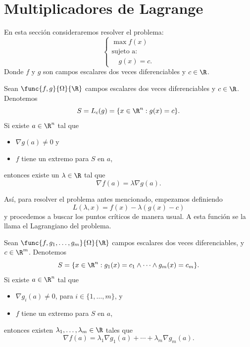 \documentclass[a4,11pt]{aleph-notas}
\begin{document}
\section{Multiplicadores de Lagrange}

En esta sección consideraremos resolver el problema:
\[
    \left\{
    \begin{array}{l}
         \max f(x) \\
         \text{sujeto a:}\\
         \quad g(x)=c.
    \end{array}\right.
\]
Donde $f$ y $g$ son campos escalares dos veces diferenciables y $c\in\R$.

\begin{teo}
    Sean $\func{f,g}{\Omega}{\R}$ campos escalares dos veces diferenciables y $c\in \R$. Denotemos
    \[
        S = L_c(g) = \{x\in \R^n: g(x)=c\}.
    \]
    Si existe $a\in\R^n$ tal que
    \begin{itemize}
        \item $\nabla g(a) \neq 0$ y
        \item $f$ tiene un extremo para $S$ en $a$,
    \end{itemize}
    entonces existe un $\lambda\in\R$ tal que
    \[
        \nabla f(a) = \lambda \nabla g(a).
    \]
\end{teo}

Así, para resolver el problema antes mencionado, empezamos definiendo
\[
    L(\lambda,x) = f(x) - \lambda (g(x)-c)
\]
y procedemos a buscar los puntos críticos de manera usual. A esta función se la llama el Lagrangiano del problema.

\begin{teo}
    Sean $\func{f,g_1,\ldots,g_m}{\Omega}{\R}$ campos escalares dos veces diferenciables, y $c\in \R^m$. Denotemos
    \[
        S = \{x\in \R^n: g_1(x)=c_1\land\cdots\land g_m(x)=c_m\}.
    \]
    Si existe $a\in\R^n$ tal que
    \begin{itemize}
        \item $\nabla g_i(a) \neq 0$, para $i\in\{1,\ldots,m\}$, y
        \item $f$ tiene un extremo para $S$ en $a$,
    \end{itemize}
    entonces existen $\lambda_1,\ldots,\lambda_m\in\R$ tales que
    \[
        \nabla f(a) = \lambda_1 \nabla g_1(a) + \cdots + \lambda_m \nabla g_m(a).
    \]
\end{teo}
\end{document}
